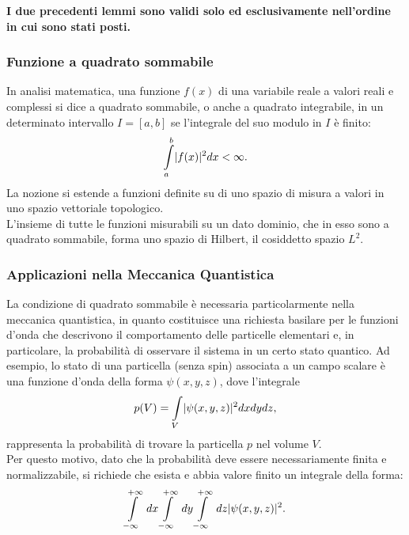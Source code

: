\documentclass[12pt,oneside,openany]{memoir}
\numberwithin{equation}{subsection}
\DeclarePairedDelimiter{\abs}{\lvert}{\rvert}
\begin{document}
\noindent\textbf{I due precedenti lemmi sono validi solo ed esclusivamente
nell'ordine in cui sono stati posti.}


\subsubsection{Funzione a quadrato sommabile}
In analisi matematica, una funzione $f(x)$ di una variabile reale a valori reali
e complessi si dice a quadrato sommabile, o anche a quadrato integrabile, in un
determinato intervallo $I = \left[a, b\right]$ se l'integrale del suo modulo in
$I$ \`e finito:
\begin{equation}
	\int\displaylimits_{a}^{b} \abs{f(x)}^2 dx < \infty.
\end{equation}
La nozione si estende a funzioni definite su di uno spazio di misura a valori in
uno spazio vettoriale topologico.\\
L'insieme di tutte le funzioni misurabili su un dato dominio, che in esso sono a
quadrato sommabile, forma uno spazio di Hilbert, il cosiddetto spazio $L^2$.


\subsubsection{Applicazioni nella Meccanica Quantistica}
La condizione di quadrato sommabile \`e necessaria particolarmente nella
meccanica quantistica, in quanto costituisce una richiesta basilare per le
funzioni d'onda che descrivono il comportamento delle particelle elementari e,
in particolare, la probabilit\`a di osservare il sistema in un certo stato
quantico. Ad esempio, lo stato di una particella (senza spin) associata a un
campo scalare \`e una funzione d'onda della forma $\psi(x, y, z)$, dove
l'integrale
\begin{equation}
	p(V) = \int\displaylimits_{V} \abs{\psi(x, y, z)}^2 dx dy dz,
\end{equation}
rappresenta la probabilit\`a di trovare la particella $p$ nel volume $V$.\\
Per questo motivo, dato che la probabilit\`a deve essere necessariamente finita
e normalizzabile, si richiede che esista e abbia valore finito un integrale
della forma:
\begin{equation}
	\int\displaylimits_{-\infty}^{+\infty} \ dx
	\int\displaylimits_{-\infty}^{+\infty} \ dy
	\int\displaylimits_{-\infty}^{+\infty} \ dz \abs{\psi(x, y, z)}^2.
\end{equation}
\end{document}
